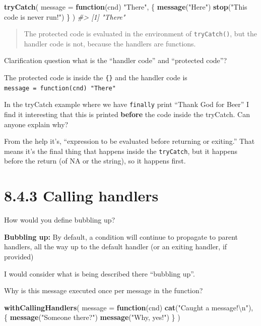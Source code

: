 \documentclass[]{book}
\newenvironment{Shaded}{\begin{snugshade}}{\end{snugshade}}
\newcommand{\CharTok}[1]{\textcolor[rgb]{0.31,0.60,0.02}{#1}}
\newcommand{\CommentTok}[1]{\textcolor[rgb]{0.56,0.35,0.01}{\textit{#1}}}
\newcommand{\ControlFlowTok}[1]{\textcolor[rgb]{0.13,0.29,0.53}{\textbf{#1}}}
\newcommand{\DataTypeTok}[1]{\textcolor[rgb]{0.13,0.29,0.53}{#1}}
\newcommand{\KeywordTok}[1]{\textcolor[rgb]{0.13,0.29,0.53}{\textbf{#1}}}
\newcommand{\NormalTok}[1]{#1}
\newcommand{\StringTok}[1]{\textcolor[rgb]{0.31,0.60,0.02}{#1}}
\begin{document}
\begin{Shaded}
\begin{Highlighting}[]
\KeywordTok{tryCatch}\NormalTok{(}
  \DataTypeTok{message =} \ControlFlowTok{function}\NormalTok{(cnd) }\StringTok{"There"}\NormalTok{,}
\NormalTok{  \{}
    \KeywordTok{message}\NormalTok{(}\StringTok{"Here"}\NormalTok{)}
    \KeywordTok{stop}\NormalTok{(}\StringTok{"This code is never run!"}\NormalTok{)}
\NormalTok{  \}}
\NormalTok{)}
\CommentTok{#> [1] "There"}
\end{Highlighting}
\end{Shaded}

\begin{quote}
The protected code is evaluated in the environment of \texttt{tryCatch()}, but the handler code is not, because the handlers are functions.
\end{quote}

Clarification question what is the ``handler code'' and ``protected code''?

The protected code is inside the \texttt{\{\}} and the handler code is \texttt{message\ =\ function(cnd)\ "There"}

In the tryCatch example where we have \texttt{finally} print ``Thank God for Beer'' I find it interesting that this is printed \textbf{before} the code inside the tryCatch. Can anyone explain why?

From the help it's, ``expression to be evaluated before returning or exiting.'' That means it's the final thing that happens inside the \texttt{tryCatch}, but it happens before the return (of NA or the string), so it happens first.

\hypertarget{calling-handlers}{%
\section*{8.4.3 Calling handlers}\label{calling-handlers}}

How would you define bubbling up?

\textbf{Bubbling up:} By default, a condition will continue to propagate to parent handlers, all the way up to the default handler (or an exiting handler, if provided)

I would consider what is being described there ``bubbling up''.

Why is this message executed once per message in the function?

\begin{Shaded}
\begin{Highlighting}[]
\KeywordTok{withCallingHandlers}\NormalTok{(}
  \DataTypeTok{message =} \ControlFlowTok{function}\NormalTok{(cnd) }\KeywordTok{cat}\NormalTok{(}\StringTok{"Caught a message!}\CharTok{\textbackslash{}n}\StringTok{"}\NormalTok{), }
\NormalTok{  \{}
    \KeywordTok{message}\NormalTok{(}\StringTok{"Someone there?"}\NormalTok{)}
    \KeywordTok{message}\NormalTok{(}\StringTok{"Why, yes!"}\NormalTok{)}
\NormalTok{  \}}
\NormalTok{)}
\end{Highlighting}
\end{Shaded}
\end{document}
